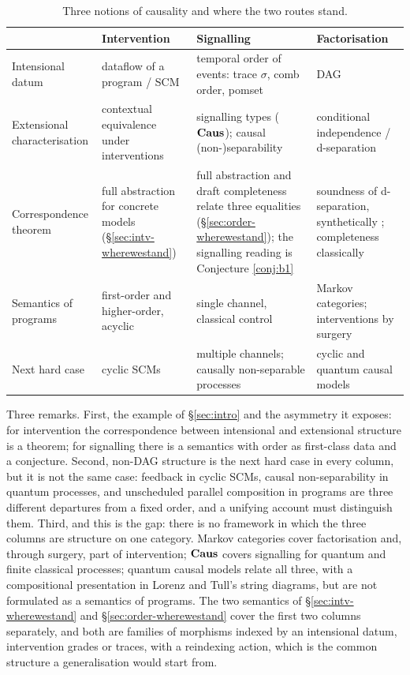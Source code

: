 \begin{table}[ht]
\centering\small
\begin{tabularx}{\textwidth}{>{\raggedright\arraybackslash}p{3.1cm}XXX}
\toprule
 & \textbf{Intervention} & \textbf{Signalling} & \textbf{Factorisation}\\
\midrule
Intensional datum & dataflow of a program / SCM & temporal order of events: trace $\sigma$, comb order, pomset & DAG\\
Extensional characterisation & contextual equivalence under interventions & signalling types ($\mathbf{Caus}$); causal (non-)separability & conditional independence / d-separation\\
Correspondence theorem & full abstraction for concrete models (\S\ref{sec:intv-wherewestand}) & full abstraction and draft completeness relate three equalities (\S\ref{sec:order-wherewestand}); the signalling reading is Conjecture \ref{conj:b1} & soundness of d-separation, synthetically \cite{fritz2023dseparation}; completeness classically\\
Semantics of programs & first-order and higher-order, acyclic & single channel, classical control & Markov categories; interventions by surgery\\
Next hard case & cyclic SCMs & multiple channels; causally non-separable processes & cyclic and quantum causal models\\
\bottomrule
\end{tabularx}
\caption{Three notions of causality and where the two routes stand.}\label{tab:synthesis}
\end{table}

Three remarks. First, the example of \S\ref{sec:intro} and the asymmetry it exposes: for intervention the correspondence between intensional and extensional structure is a theorem; for signalling there is a semantics with order as first-class data and a conjecture. Second, non-DAG structure is the next hard case in every column, but it is not the same case: feedback in cyclic SCMs, causal non-separability in quantum processes, and unscheduled parallel composition in programs are three different departures from a fixed order, and a unifying account must distinguish them. Third, and this is the gap: there is no framework in which the three columns are structure on one category. Markov categories cover factorisation and, through surgery, part of intervention; $\mathbf{Caus}$ covers signalling for quantum and finite classical processes; quantum causal models relate all three, with a compositional presentation in Lorenz and Tull's string diagrams, but are not formulated as a semantics of programs. The two semantics of \S\ref{sec:intv-wherewestand} and \S\ref{sec:order-wherewestand} cover the first two columns separately, and both are families of morphisms indexed by an intensional datum, intervention grades or traces, with a reindexing action, which is the common structure a generalisation would start from.

